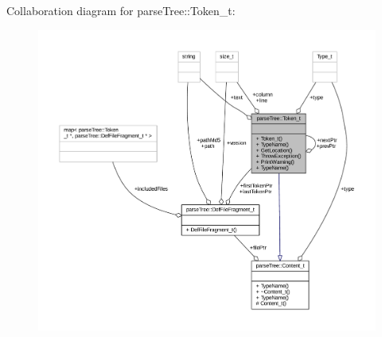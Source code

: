 Collaboration diagram for parse\+Tree\+:\+:Token\+\_\+t\+:
\nopagebreak
\begin{figure}[H]
\begin{center}
\leavevmode
\includegraphics[width=350pt]{structparse_tree_1_1_token__t__coll__graph}
\end{center}
\end{figure}
